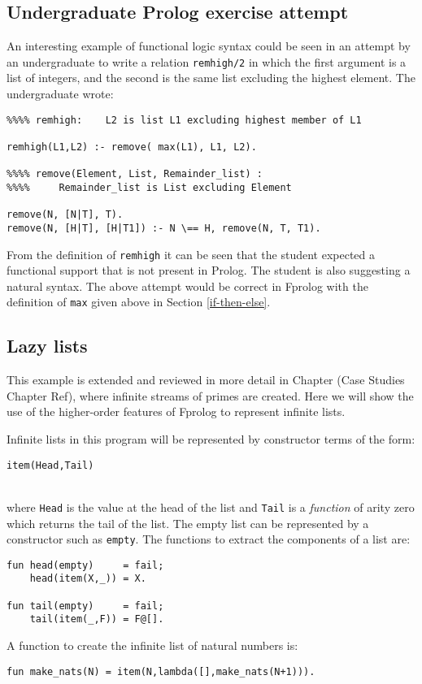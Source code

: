 \documentclass[a4paper,11pt,twoside]{article}
\begin{document}
\subsection{Undergraduate Prolog exercise attempt}

An interesting example of functional logic syntax could be seen in an
attempt by an undergraduate to write a relation \texttt{remhigh/2} in which
the first argument is a list of integers, and the second is the same list
excluding the highest element.  The undergraduate wrote:
\begin{verbatim}
%%%% remhigh:    L2 is list L1 excluding highest member of L1

remhigh(L1,L2) :- remove( max(L1), L1, L2).

%%%% remove(Element, List, Remainder_list) :
%%%%     Remainder_list is List excluding Element

remove(N, [N|T], T).
remove(N, [H|T], [H|T1]) :- N \== H, remove(N, T, T1).
\end{verbatim}
From the definition of \texttt{remhigh} it can be seen that the student
expected a functional support that is not present in Prolog.  The student
is also suggesting a natural syntax.
The above attempt would be correct in Fprolog with the
definition of \texttt{max} given above in Section \ref{if-then-else}.

\subsection{Lazy lists}

This example is extended and reviewed in more detail in
Chapter (Case Studies Chapter Ref), where infinite streams of primes are
created.  Here we will show the use of the higher-order features of 
Fprolog to represent infinite lists.

Infinite lists in this program will be represented by constructor
terms of the form:\\
\centerline{\texttt{item(Head,Tail)}}\\
where \texttt{Head} is the value at the head of the list and \texttt{Tail}
is a \textit{function} of arity zero which returns the tail of the list.  The empty
list can be represented by a constructor such as \texttt{empty}.
The functions to extract the components of a list are:
\begin{verbatim}
fun head(empty)     = fail;
    head(item(X,_)) = X.

fun tail(empty)     = fail;
    tail(item(_,F)) = F@[].
\end{verbatim}
A function to create the infinite list of natural numbers is:\\
\centerline{\texttt{fun make\_{}nats(N) = item(N,lambda([],make\_{}nats(N+1))).}}
\end{document}
